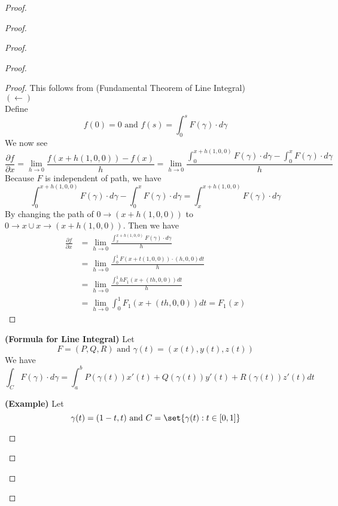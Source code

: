 \documentclass{report}
\begin{document}
\begin{proof}
\begin{proof}
\begin{proof}
\begin{proof}
\begin{proof}
This follows from  (Fundamental Theorem of Line Integral)\\

$(\longleftarrow)$\\

Define
\begin{equation}
f(0)=0\text{ and }f(s)=\int_0^s F(\gamma )\cdot d\gamma 
\end{equation}
We now see 
\begin{equation}
\frac{\partial f}{\partial x}= \lim_{h\to 0} \frac{f(x+h(1,0,0))-f(x)}{h}=\lim_{h\to 0}\frac{\int_0^{x+h(1,0,0)}F(\gamma )\cdot d \gamma -\int_0^x F(\gamma )\cdot d\gamma }{h}
\end{equation}
Because $F$ is independent of path, we have
 \begin{equation}
\int_0^{x+h(1,0,0)}F(\gamma )\cdot d \gamma -\int_0^x F(\gamma )\cdot d\gamma =\int_x^{x+h(1,0,0)}F(\gamma )\cdot d\gamma 
\end{equation}
By changing the path of $0\to (x+h(1,0,0))$ to $0\to x \cup  x\to (x+h(1,0,0))$. Then we have
\begin{align}
\frac{\partial f}{\partial x}&=\lim_{h\to 0}\frac{\int_x^{x+h(1,0,0)} F(\gamma )\cdot d\gamma }{h}\\
&=\lim_{h\to 0}\frac{\int_0^1 F(x+t(1,0,0))\cdot (h,0,0)dt}{h}\\
&=\lim_{h\to 0}\frac{\int_0^1 h F_1(x+(th,0,0))dt}{h}\\
&=\lim_{h\to 0}\int_0^1 F_1(x+(th,0,0))dt=F_1(x)
\end{align}
\end{proof}
\begin{theorem}
\label{9.2.5}
\textbf{(Formula for Line Integral)} Let 
 \begin{equation}
F=(P,Q,R)\text{ and }\gamma (t)=(x(t),y(t),z(t))
\end{equation}
We have
\begin{equation}
\int_C F(\gamma )\cdot d\gamma =\int_a^b P(\gamma (t)) x'(t)+Q(\gamma (t)) y'(t)+R(\gamma (t)) z'(t)dt
\end{equation}
\end{theorem}
\begin{theorem}
\label{9.2.6}
\textbf{(Example)} Let
\begin{equation}
\gamma (t)=(1-t,t)\text{ and }C=\set{\gamma (t):t\in [0,1]}
\end{equation}

\end{theorem}
\end{proof}
\end{proof}
\end{proof}
\end{proof}
\end{document}
